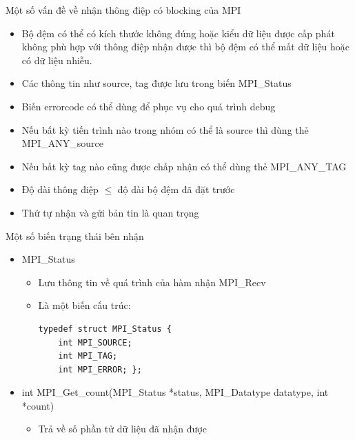 \documentclass[10pt]{beamer}
\theoremstyle{remark}
\numberwithin{algocf}{section}
\numberwithin{equation}{section}
\numberwithin{dl}{section}
\numberwithin{figure}{section}
\begin{document}
\begin{frame}{Một số vấn đề về nhận thông điệp có blocking của MPI}
    \begin{itemize}
        \item Bộ đệm có thể có kích thước không đúng hoặc kiểu dữ liệu được cấp phát không phù hợp với thông điệp nhận được thì bộ đệm có thể mất dữ liệu hoặc có dữ liệu nhiễu.
        \item Các thông tin như source, tag được lưu trong biến MPI\_Status
        \item Biến errorcode có thể dùng để phục vụ cho quá trình debug
        \item Nếu bất kỳ tiến trình nào trong nhóm có thể là source thì dùng thẻ MPI\_ANY\_source
        \item Nếu bất kỳ tag nào cũng được chấp nhận có thể dùng thẻ MPI\_ANY\_TAG
        \item Độ dài thông điệp $\leq$ độ dài bộ đệm đã đặt trước
        \item Thứ tự nhận và gửi bản tin là quan trọng
    \end{itemize}
\end{frame}

\begin{frame}[fragile]{Một số biến trạng thái bên nhận}
    \begin{itemize}
        \item MPI\_Status
        \begin{itemize}
            \item Lưu thông tin về quá trình của hàm nhận MPI\_Recv
            \item Là một biến cấu trúc:
            \begin{verbatim}
typedef struct MPI_Status {
    int MPI_SOURCE;
    int MPI_TAG;
    int MPI_ERROR; };
            \end{verbatim}
        \end{itemize}
        \item int MPI\_Get\_count(MPI\_Status *status, MPI\_Datatype datatype, int *count) 
        \begin{itemize}
            \item Trả về số phần tử dữ liệu đã nhận được 
        \end{itemize}
    \end{itemize}
\end{frame}
\end{document}
